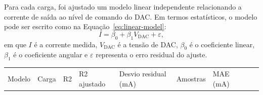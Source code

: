 \documentclass[
  brazilian,
]{article}
\newcounter{none} %
\renewcommand{\_}{\oldunderscore\discretionary{}{}{}}
\begin{document}
Para cada carga, foi ajustado um modelo linear independente relacionando
a corrente de saída ao nível de comando do DAC. Em termos estatísticos, o
modelo pode ser escrito como na Equação~\ref{eq:linear-model}:
\begin{equation}
I = \beta_0 + \beta_1 V_{\mathrm{DAC}} + \varepsilon,
\label{eq:linear-model}
\end{equation}
em que \(I\) é a corrente medida, \(V_{\mathrm{DAC}}\) é a tensão de DAC,
\(\beta_0\) é o coeficiente linear, \(\beta_1\) é o coeficiente angular e
\(\varepsilon\) representa o erro residual do ajuste.

{\def\LTcaptype{none} %
\begin{longtable}[]{@{}
  >{\raggedright\arraybackslash}p{}
  >{\raggedright\arraybackslash}p{}
  >{\raggedright\arraybackslash}p{}
  >{\raggedright\arraybackslash}p{}
  >{\raggedright\arraybackslash}p{}
  >{\raggedright\arraybackslash}p{}
  >{\raggedright\arraybackslash}p{}
  >{\raggedright\arraybackslash}p{}
  >{\raggedright\arraybackslash}p{}@{}}
\toprule\noalign{}
\begin{minipage}[b]{\linewidth}\raggedright
Modelo
\end{minipage} & \begin{minipage}[b]{\linewidth}\raggedright
Carga
\end{minipage} & \begin{minipage}[b]{\linewidth}\raggedright
R2
\end{minipage} & \begin{minipage}[b]{\linewidth}\raggedright
R2 ajustado
\end{minipage} & \begin{minipage}[b]{\linewidth}\raggedright
Desvio residual (mA)
\end{minipage} & \begin{minipage}[b]{\linewidth}\raggedright
Amostras
\end{minipage} & \begin{minipage}[b]{\linewidth}\raggedright
MAE (mA)
\end{minipage} & \begin{minipage}[b]{\linewidth}\raggedright

\end{minipage}
\end{longtable}}
\end{document}
